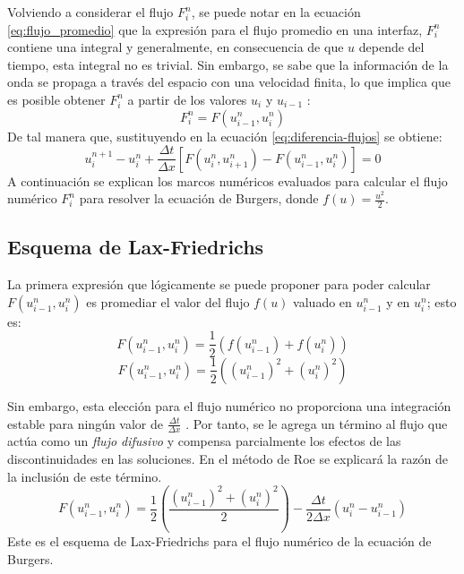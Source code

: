 \documentclass[12pt]{article}
\begin{document}
	Volviendo a considerar el flujo $F_{i}^{n}$, se puede notar en la ecuación \ref{eq:flujo_promedio} que la expresión para el flujo promedio en una interfaz, $F_{i}^{n}$ contiene una integral y generalmente, en consecuencia de que $u$ depende del tiempo, esta integral no es trivial. Sin embargo, se sabe que la información de la onda se propaga a través del espacio con una velocidad finita, lo que implica que es posible obtener $F_{i}^{n}$ a partir de los valores $u_i$ y $u_{i-1}$ \cite{LeVeque1998}:
	\begin{equation}
		F_{i}^{n} = F(u_{i-1}^{n}, u_{i}^{n})
	\end{equation}
	De tal manera que, sustituyendo en la ecuación \ref{eq:diferencia-flujos} se obtiene:
	\begin{equation}
		u_{i}^{n+1} - u_{i}^{n} + \frac{\Delta t}{\Delta x}\left[ F(u_{i}^{n}, u_{i+1}^{n}) - F(u_{i-1}^{n}, u_{i}^{n})\right] = 0
		\label{eq:flux-diff}
	\end{equation}
	A continuación se explican los marcos numéricos evaluados para calcular el flujo numérico $F_{i}^{n}$ para resolver la ecuación de Burgers, donde $f(u)=\frac{u^2}{2}$.
	
	\subsection{Esquema de Lax-Friedrichs}
	La primera expresión que lógicamente se puede proponer para poder calcular $F(u_{i-1}^{n}, u_{i}^{n})$ es promediar el valor del flujo $f(u)$ valuado en $u_{i-1}^{n}$ y en $u_{i}^{n}$; esto es:
	\begin{equation}
		F(u_{i-1}^{n}, u_{i}^{n}) = \frac{1}{2} \left( f(u_{i-1}^{n}) + f(u_{i}^{n})\right) 
	\end{equation}
	\begin{equation}
		F(u_{i-1}^{n}, u_{i}^{n}) = \frac{1}{2} \left( (u_{i-1}^{n})^2 + (u_{i}^{n})^2 \right) 
	\end{equation}
	
	Sin embargo, esta elección para el flujo numérico no proporciona una integración estable para ningún valor de $\frac{\Delta t}{\Delta x}$ \cite{LeVeque1998}. Por tanto, se le agrega un término al flujo que actúa como un \textit{flujo difusivo} y compensa parcialmente los efectos de las discontinuidades en las soluciones. En el método de Roe se explicará la razón de la inclusión de este término.
	\begin{equation}
		{\boxed{F(u_{i-1}^{n}, u_{i}^{n}) = \frac{1}{2} \left( \frac{(u_{i-1}^{n})^2 + (u_{i}^{n})^2}{2} \right)  - \frac{\Delta t}{2\Delta x}(u_{i}^{n}-u_{i-1}^{n})} }
	\end{equation}
	Este es el esquema de Lax-Friedrichs para el flujo numérico de la ecuación de Burgers.
	
\end{document}
